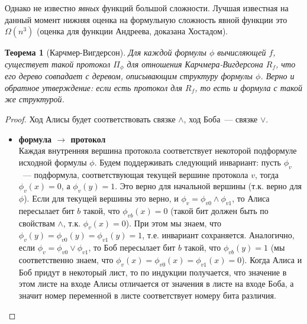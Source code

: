 \documentclass[12pt]{article}
\theoremstyle{definition}
\theoremstyle{plain}
\newtheorem{theorem}{Теорема}[section]
\theoremstyle{remark}
\begin{document}
Однако не известно \emph{явных} функций большой сложности. Лучшая известная на данный момент
нижняя оценка на формульную сложность явной функции это $\Omega(n^3)$ 
(оценка для функции Андреева, доказана Хостадом).

\begin{theorem}[Карчмер-Вигдерсон]
    Для каждой формулы $\phi$ вычисляющей $f$, существует такой
    протокол $\Pi_\phi$ для отношения Карчмера-Вигдерсона $R_f$, что его дерево
    совпадает с деревом, описывающим структуру формулы $\phi$. 
    Верно и обратное утверждение: если есть протокол для $R_f$, 
    то есть и формула с такой же структурой.
\end{theorem}
\begin{proof}
    Ход Алисы будет соответствовать связке $\land$,
    ход Боба~--- связке $\lor$. 

    \begin{itemize}
        \item \textbf{формула $\to$ протокол}\\
            Каждая внутренняя вершина протокола соответствует некоторой
            подформуле исходной формулы $\phi$. Будем поддерживать следующий инвариант: пусть $\phi_v$~--- 
            подформула, соответствующая текущей вершине протокола $v$, тогда $\phi_v(x) = 0$, а $\phi_v(y) = 1$.
            Это верно для начальной вершины (т.к. верно для $\phi$). Если для текущей вершины это верно, и
            $\phi_v = \phi_{v0} \land \phi_{v1}$, то Алиса пересылает бит $b$ такой, что
            $\phi_{vb}(x) = 0$ (такой бит должен быть по свойствам $\land$, т.к. $\phi_v(x) = 0$). 
            При этом мы знаем, что $\phi_v(y) = \phi_{v0}(y) = \phi_{v1}(y) = 1$, т.е. инвариант сохраняется.
            Аналогично, если $\phi_v = \phi_{v0} \lor \phi_{v1}$, то Боб пересылает бит $b$ такой, 
            что $\phi_{vb}(y) = 1$ (мы соответственно знаем, что $\phi_v(x) = \phi_{v0}(x) = \phi_{v1}(x) = 0$).
            Когда Алиса и Боб придут в некоторый лист, то по индукции получается, что значение в этом 
            листе на входе Алисы отличается от значения в листе на входе Боба, а значит номер переменной
            в листе соответствует номеру бита различия.


\end{itemize}
\end{proof}
\end{document}

